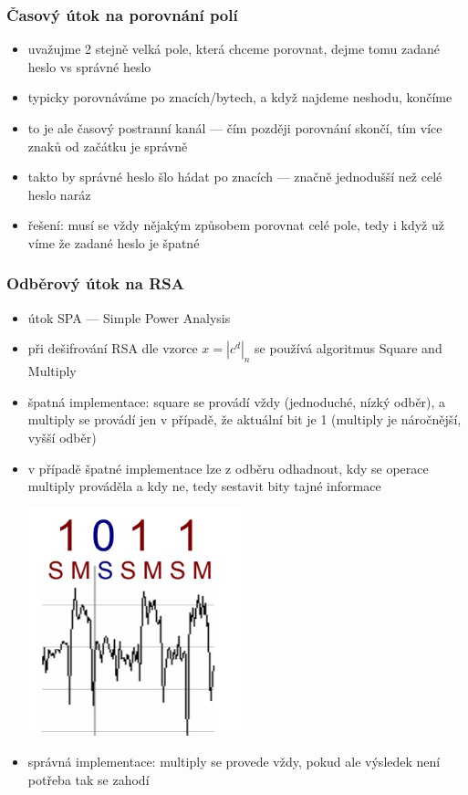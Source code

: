 \subsubsection*{Časový útok na porovnání polí}
\begin{itemize}
	\item uvažujme 2 stejně velká pole, která chceme porovnat, dejme tomu zadané heslo vs správné heslo
	\item typicky porovnáváme po znacích/bytech, a když najdeme neshodu, končíme
	\item to je ale časový postranní kanál --- čím později porovnání skončí, tím více znaků od začátku je správně
	\item takto by správné heslo šlo hádat po znacích --- značně jednodušší než celé heslo naráz
	\item řešení: musí se vždy nějakým způsobem porovnat celé pole, tedy i když už víme že zadané heslo je špatné
\end{itemize}

\subsubsection*{Odběrový útok na RSA}
\begin{itemize}
	\item útok SPA --- Simple Power Analysis
	\item při dešifrování RSA dle vzorce $x = |c^d|_n$ se používá algoritmus Square and Multiply
	\item špatná implementace: square se provádí vždy (jednoduché, nízký odběr), a multiply se provádí jen  v případě, že aktuální bit je 1 (multiply je náročnější, vyšší odběr)
	\item v případě špatné implementace lze z odběru odhadnout, kdy se operace multiply prováděla a kdy ne, tedy sestavit bity tajné informace 
	
	\includegraphics[width=0.5\textwidth]{img/OB-17_1.jpg}
	
	\item správná implementace: multiply se provede vždy, pokud ale výsledek není potřeba tak se zahodí
\end{itemize}

